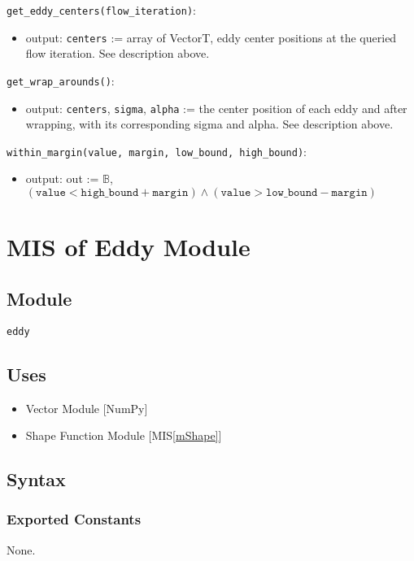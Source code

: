 \documentclass[12pt, titlepage]{article}
\begin{document}
\noindent \texttt{get\_eddy\_centers(flow\_iteration)}:
\begin{itemize}
  \item output: \texttt{centers} := array of VectorT, eddy center positions at the queried flow iteration. See description above.
\end{itemize}

\noindent \texttt{get\_wrap\_arounds()}:
\begin{itemize}
  \item output: \texttt{centers}, \texttt{sigma}, \texttt{alpha} := the center position of each eddy and after wrapping, with its corresponding sigma and alpha. See description above.
\end{itemize}

\noindent \texttt{within\_margin(value, margin, low\_bound, high\_bound)}:
\begin{itemize}
\item output: out := $\mathbb{B}$, $(\texttt{value} < \texttt{high\_bound} + \texttt{margin}) \land (\texttt{value} > \texttt{low\_bound} - \texttt{margin})$
\end{itemize}



\newpage
\section{MIS of Eddy Module} \label{mEddy} 

\subsection{Module}
\texttt{eddy}

\subsection{Uses}
\begin{itemize}
\item Vector Module [NumPy]
\item Shape Function Module [MIS\ref{mShape}]
\end{itemize}

\subsection{Syntax}

\subsubsection{Exported Constants}
None.
\end{document}
